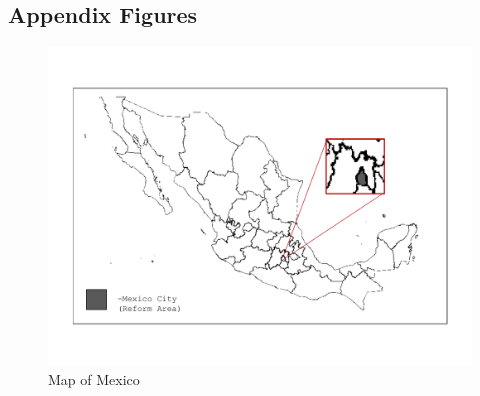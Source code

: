 \documentclass[a4paper, 11pt]{article}
\begin{document}
\begin{spacing}{1.4}
\section{Appendix Figures}
\begin{figure}[H]
  \caption{Map of Mexico}\label{Map}\centering
  \includegraphics[scale=0.6]{figures/MapMexico.pdf}
\end{figure}
 

\end{spacing}
\end{document}
